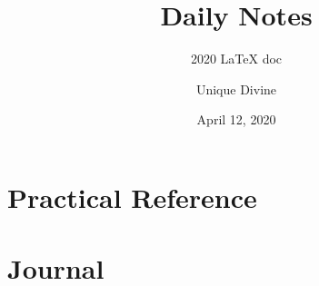 \documentclass[11pt, fancy, bibstyle=apalike, cite=authoryear]{elegantbook}
\title{Daily Notes}
\subtitle{2020 \LaTeX{} doc}
\author{Unique Divine}
\institute{Elegant\LaTeX{} Program}
\date{April 12, 2020}
\begin{document}
\maketitle
\frontmatter
\tableofcontents



\mainmatter



\part{Practical Reference}





\part{Journal}



\end{document}
